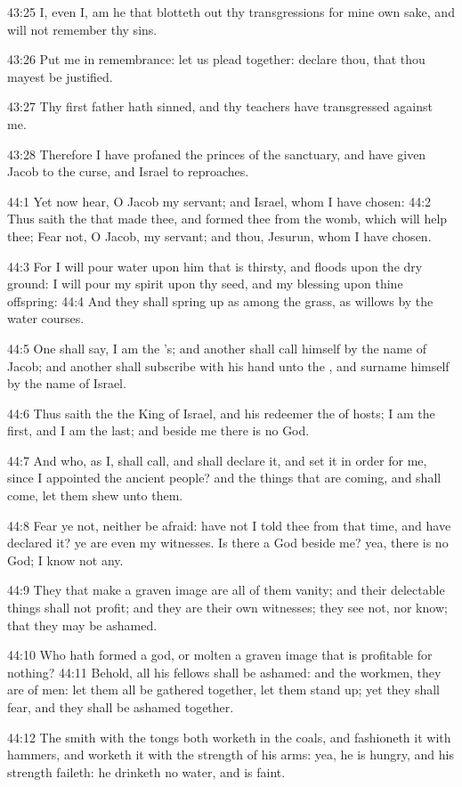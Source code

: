 43:25 I, even I, am he that blotteth out thy transgressions for mine
own sake, and will not remember thy sins.

43:26 Put me in remembrance: let us plead together: declare thou, that
thou mayest be justified.

43:27 Thy first father hath sinned, and thy teachers have transgressed
against me.

43:28 Therefore I have profaned the princes of the sanctuary, and have
given Jacob to the curse, and Israel to reproaches.

44:1 Yet now hear, O Jacob my servant; and Israel, whom I have chosen:
44:2 Thus saith the \LORD that made thee, and formed thee from the
womb, which will help thee; Fear not, O Jacob, my servant; and thou,
Jesurun, whom I have chosen.

44:3 For I will pour water upon him that is thirsty, and floods upon
the dry ground: I will pour my spirit upon thy seed, and my blessing
upon thine offspring: 44:4 And they shall spring up as among the
grass, as willows by the water courses.

44:5 One shall say, I am the \LORD's; and another shall call himself by
the name of Jacob; and another shall subscribe with his hand unto the
\LORD, and surname himself by the name of Israel.

44:6 Thus saith the \LORD the King of Israel, and his redeemer the \LORD
of hosts; I am the first, and I am the last; and beside me there is no
God.

44:7 And who, as I, shall call, and shall declare it, and set it in
order for me, since I appointed the ancient people? and the things
that are coming, and shall come, let them shew unto them.

44:8 Fear ye not, neither be afraid: have not I told thee from that
time, and have declared it? ye are even my witnesses. Is there a God
beside me? yea, there is no God; I know not any.

44:9 They that make a graven image are all of them vanity; and their
delectable things shall not profit; and they are their own witnesses;
they see not, nor know; that they may be ashamed.

44:10 Who hath formed a god, or molten a graven image that is
profitable for nothing?  44:11 Behold, all his fellows shall be
ashamed: and the workmen, they are of men: let them all be gathered
together, let them stand up; yet they shall fear, and they shall be
ashamed together.

44:12 The smith with the tongs both worketh in the coals, and
fashioneth it with hammers, and worketh it with the strength of his
arms: yea, he is hungry, and his strength faileth: he drinketh no
water, and is faint.

